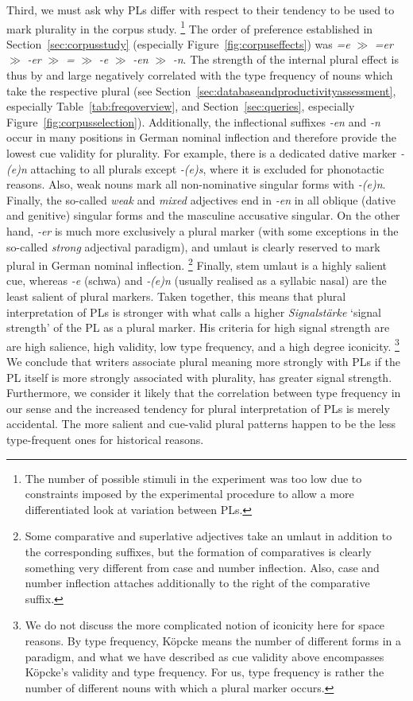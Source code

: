 Third, we must ask why PLs differ with respect to their tendency to be used to mark plurality in the corpus study.%
\footnote{The number of possible stimuli in the experiment was too low due to constraints imposed by the experimental procedure to allow a more differentiated look at variation between PLs.}
The order of preference established in Section~\ref{sec:corpusstudy} (especially Figure~\ref{fig:corpuseffects}) was \textit{=e} $\gg$ \textit{=er} $\gg$ \textit{-er} $\gg$ \textit{=} $\gg$ \textit{-e} $\gg$ \textit{-en} $\gg$ \textit{-n}.
The strength of the internal plural effect is thus by and large negatively correlated with the type frequency of nouns which take the respective plural (see Section~\ref{sec:databaseandproductivityassessment}, especially Table~\ref{tab:freqoverview}, and Section~\ref{sec:queries}, especially Figure~\ref{fig:corpusselection}).
Additionally, the inflectional suffixes \textit{-en} and \textit{-n} occur in many positions in German nominal inflection and therefore provide the lowest cue validity for plurality.
For example, there is a dedicated dative marker \textit{-(e)n} attaching to all plurals except \textit{-(e)s}, where it is excluded for phonotactic reasons.
Also, weak nouns mark all non-nominative singular forms with \textit{-(e)n}.
Finally, the so-called \textit{weak} and \textit{mixed} adjectives end in \textit{-en} in all oblique (dative and genitive) singular forms and the masculine accusative singular.
On the other hand, \textit{-er} is much more exclusively a plural marker (with some exceptions in the so-called \textit{strong} adjectival paradigm), and umlaut is clearly reserved to mark plural in German nominal inflection.%
\footnote{Some comparative and superlative adjectives take an umlaut in addition to the corresponding suffixes, but the formation of comparatives is clearly something very different from case and number inflection.
Also, case and number inflection attaches additionally to the right of the comparative suffix.}
Finally, stem umlaut is a highly salient cue, whereas \textit{-e} (schwa) and \textit{-(e)n} (usually realised as a syllabic nasal) are the least salient of plural markers.
Taken together, this means that plural interpretation of PLs is stronger with what \textcite{Koepcke1993} calls a higher \textit{Signalstärke} `signal strength' of the PL as a plural marker.
His criteria for high signal strength are are high salience, high validity, low type frequency, and a high degree iconicity.%
\footnote{We do not discuss the more complicated notion of iconicity here for space reasons.
By type frequency, Köpcke means the number of different forms in a paradigm, and what we have described as cue validity above encompasses Köpcke's validity and type frequency.
For us, type frequency is rather the number of different nouns with which a plural marker occurs.}
We conclude that writers associate plural meaning more strongly with PLs if the PL itself is more strongly associated with plurality, \ie has greater signal strength.
Furthermore, we consider it likely that the correlation between type frequency in our sense and the increased tendency for plural interpretation of PLs is merely accidental.
The more salient and cue-valid plural patterns happen to be the less type-frequent ones for historical reasons.

